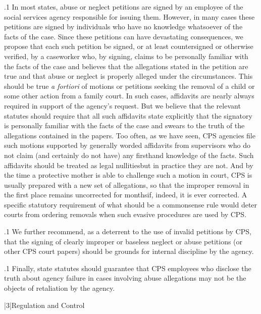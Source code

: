 \documentclass[11pt, twoside]{article}
\begin{document}
{\p.1{%
In most states, abuse or neglect petitions are signed by an employee
of the social services agency responsible for issuing them. However,
in many cases these petitions are signed by individuals who have no
knowledge whatsoever of the facts of the case. Since these petitions can
have devastating consequences, we propose that each such petition be
signed, or at least countersigned or otherwise verified, by a caseworker
who, by signing, claims to be personally familiar with the facts of the
case and believes that the allegations stated in the petition are true and
that abuse or neglect is properly alleged under the circumstances. This
should be true \textit{a fortiori} of motions or petitions seeking the removal
of a child or some other action from a family court. In such cases, affidavits are nearly always required in support of the agency’s request.
But we believe that the relevant statutes should require that all such affidavits state explicitly that the signatory is personally familiar with the
facts of the case and swears to the truth of the allegations contained in
the papers. Too often, as we have seen, CPS agencies file such motions
supported by generally worded affidavits from supervisors who do not
claim (and certainly do not have) any firsthand knowledge of the facts.
Such affidavits should be treated as legal nullities\mdash{}but in practice they
are not. And by the time a protective mother is able to challenge such a
motion in court, CPS is usually prepared with a new set of allegations,
so that the improper removal in the first place remains uncorrected for
months\mdash{}if, indeed, it is ever corrected. A specific statutory requirement of what should be a commonsense rule would deter courts from
ordering removals when such evasive procedures are used by CPS.
}%

\p.1{%
We further recommend, as a deterrent to the use of invalid petitions
by CPS, that the signing of clearly improper or baseless neglect or abuse
petitions (or other CPS court papers) should be grounds for internal
discipline by the agency.
}%

\p.1{%
Finally, state statutes should guarantee that CPS employees who
disclose the truth about agency failure in cases involving abuse allegations may not be the objects of retaliation by the agency.
}%


\s|3|{Regulation and Control}

}
\end{document}
